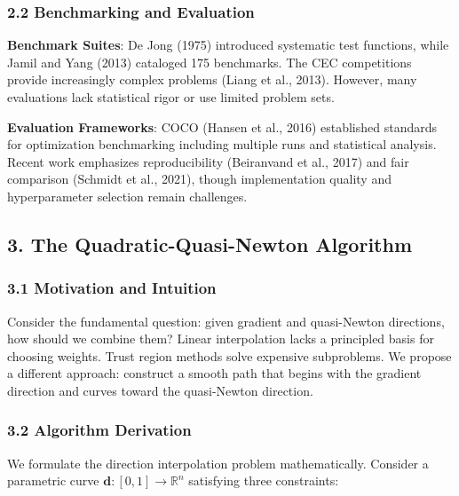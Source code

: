\hypertarget{benchmarking-and-evaluation}{%
\subsubsection{2.2 Benchmarking and Evaluation}\label{benchmarking-and-evaluation}}

\textbf{Benchmark Suites}: De Jong (1975) introduced systematic test functions, while Jamil and Yang (2013) cataloged 175
benchmarks. The CEC competitions provide increasingly complex problems (Liang et al., 2013). However, many evaluations
lack statistical rigor or use limited problem sets.

\textbf{Evaluation Frameworks}: COCO (Hansen et al., 2016) established standards for optimization benchmarking including
multiple runs and statistical analysis. Recent work emphasizes reproducibility (Beiranvand et al., 2017) and fair
comparison (Schmidt et al., 2021), though implementation quality and hyperparameter selection remain challenges.

\hypertarget{the-quadratic-quasi-newton-algorithm}{%
\subsection{3. The Quadratic-Quasi-Newton Algorithm}\label{the-quadratic-quasi-newton-algorithm}}

\hypertarget{motivation-and-intuition}{%
\subsubsection{3.1 Motivation and Intuition}\label{motivation-and-intuition}}

Consider the fundamental question: given gradient and quasi-Newton directions, how should we combine them? Linear
interpolation lacks a principled basis for choosing weights. Trust region methods solve expensive subproblems. We
propose a different approach: construct a smooth path that begins with the gradient direction and curves toward the
quasi-Newton direction.

\hypertarget{algorithm-derivation}{%
\subsubsection{3.2 Algorithm Derivation}\label{algorithm-derivation}}

We formulate the direction interpolation problem mathematically. Consider a parametric curve
\(\mathbf{d}: [0,1] \rightarrow \mathbb{R}^n\) satisfying three constraints:

